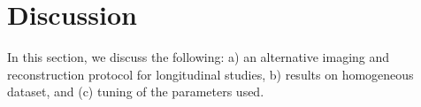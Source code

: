 \documentclass[journal]{IEEEtran}
\begin{document}
\section{Discussion}
\label{sec:discussion}
In this section, we discuss the following:  a) an alternative imaging and reconstruction protocol for longitudinal studies, b) results on homogeneous dataset, and (c) tuning of the parameters used.
\end{document}
